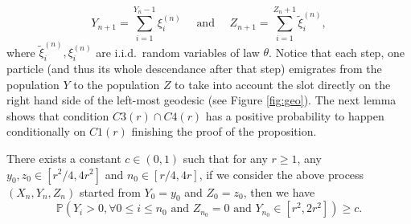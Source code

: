 \documentclass[AHL,XML,longabstracts,Unicode,NoSaveZebib]{cedram}
\begin{document}
$$ Y_{n+1} = \sum_{i=1}^{Y_{n}-1} \xi^{(n)}_{i} \quad \mbox{ and } \quad
Z_{n+1} = \sum_{i=1}^{Z_{n}+1} \tilde{\xi}^{(n)}_{i},$$
where $\tilde{\xi}^{(n)}_{i}, \xi^{{(n)}}_{i}$ are i.i.d.~random variables of law $\theta$. Notice that each step, one particle (and thus its whole descendance after that step) emigrates from the population $Y$ to the population $Z$ {to take into account the slot directly on the right hand side of the left-most geodesic (see Figure \ref{fig:geo})}. The next lemma shows that condition $C3(r) \cap C4(r)$ has a positive probability to happen conditionally on $C1(r)$ finishing the proof of the proposition.
\begin{lemma} \label{lem:immigration} There exists a constant $c \in (0,1)$ such that for any $r \geq 1$, any $y_{0},z_{0} \in [r^{2}/4, 4r^{2}]$ and $n_{0} \in [r/4, 4r]$, if we consider the above process $(X_{n},Y_{n},Z_{n})$ started from $Y_{0}=y_{0}$ and $Z_{0}=z_{0}$, then  we have
\[
\mathbb P\left( Y_{i}>0, \forall 0 \leq i \leq n_{0} \mbox{ and } Z_{n_{0}} = 0 \mbox{ and } Y_{n_{0}}  \in [r^{2}, 2 r^{2}] \right) \geq c.
\]
\end{lemma}
\end{document}
